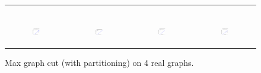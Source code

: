 \begin{figure}[ht]
\begin{tabular}{cccc}
\begin{subfigure}[b]{0.22\textwidth}
			\caption{}
			\label{appfig:partition:diffFA_CF2G_it2004_maxgraphcut}
	  \end{subfigure} \\
	  \begin{subfigure}[b]{0.22\textwidth}
	  	\includegraphics[width=110pt]{images_partition/validated_CC2G_friendster_maxgraphcut.pdf}
			\caption{}
			\label{appfig:partition:validated_CC2G_friendster_maxgraphcut}
	  \end{subfigure} &
	  \begin{subfigure}[b]{0.22\textwidth}
	  	\includegraphics[width=110pt]{images_partition/validated_CC2G_arabic2005_maxgraphcut.pdf}
			\caption{}
			\label{appfig:partition:validated_CC2G_arabic2005_maxgraphcut}
	  \end{subfigure} &
	  \begin{subfigure}[b]{0.22\textwidth}
	  	\includegraphics[width=110pt]{images_partition/validated_CC2G_uk2005_maxgraphcut.pdf}
			\caption{}
			\label{appfig:partition:validated_CC2G_uk2005_maxgraphcut}
	  \end{subfigure} &
	  \begin{subfigure}[b]{0.22\textwidth}
	  	\includegraphics[width=110pt]{images_partition/validated_CC2G_it2004_maxgraphcut.pdf}
			\caption{}
			\label{appfig:partition:validated_CC2G_it2004_maxgraphcut}
	  \end{subfigure} \\
  \end{tabular}
  \caption{Max graph cut (with partitioning) on 4 real graphs.}
\end{figure}





